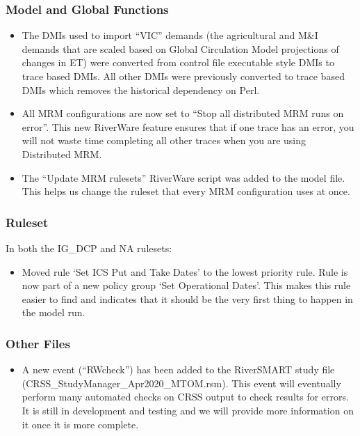 \documentclass[
]{article}
\providecommand{\tightlist}{%
  \setlength{\itemsep}{0pt}\setlength{\parskip}{0pt}}
\begin{document}
\hypertarget{model-and-global-functions}{%
\subsubsection{Model and Global
Functions}\label{model-and-global-functions}}

\begin{itemize}
\tightlist
\item
  The DMIs used to import ``VIC'' demands (the agricultural and M\&I
  demands that are scaled based on Global Circulation Model projections
  of changes in ET) were converted from control file executable style
  DMIs to trace based DMIs. All other DMIs were previously converted to
  trace based DMIs which removes the historical dependency on Perl.
\item
  All MRM configurations are now set to ``Stop all distributed MRM runs
  on error''. This new RiverWare feature ensures that if one trace has
  an error, you will not waste time completing all other traces when you
  are using Distributed MRM.
\item
  The ``Update MRM rulesets'' RiverWare script was added to the model
  file. This helps us change the ruleset that every MRM configuration
  uses at once.
\end{itemize}

\hypertarget{ruleset}{%
\subsubsection{Ruleset}\label{ruleset}}

In both the IG\_DCP and NA rulesets:

\begin{itemize}
\tightlist
\item
  Moved rule `Set ICS Put and Take Dates' to the lowest priority rule.
  Rule is now part of a new policy group `Set Operational Dates'. This
  makes this rule easier to find and indicates that it should be the
  very first thing to happen in the model run.
\end{itemize}

\hypertarget{other-files}{%
\subsubsection{Other Files}\label{other-files}}

\begin{itemize}
\tightlist
\item
  \raggedright A new event (``RWcheck'') has been added to the
  RiverSMART study file (CRSS\_StudyManager\_Apr2020\_MTOM.rsm). This
  event will eventually perform many automated checks on CRSS output to
  check results for errors. It is still in development and testing and
  we will provide more information on it once it is more complete.
\end{itemize}
\end{document}
